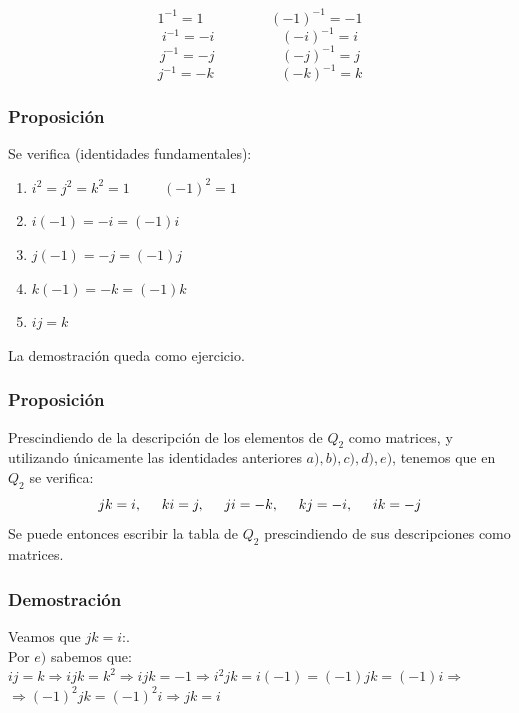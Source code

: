 \documentclass[11pt,a4paper]{article}
\begin{document}
$$1^{-1} = 1 \hspace{2cm} (-1)^{-1} = -1$$
$$i^{-1} = -i \hspace{2cm} (-i)^{-1} = i$$
$$j^{-1} = -j \hspace{2cm} (-j)^{-1} = j$$
$$j^{-1} = -k \hspace{2cm} (-k)^{-1} = k$$

\subsubsection*{Proposición}

Se verifica (identidades fundamentales):
\begin{enumerate}[label=\alph*)]
\item $i^{2} = j^{2} = k^{2} = 1 \hspace{1cm} (-1)^{2} = 1$
\item $i(-1) = -i = (-1)i$
\item $j(-1) = -j = (-1)j$
\item $k(-1) = -k = (-1)k$
\item $ij = k$
\end{enumerate}

La demostración queda como ejercicio.

\subsubsection*{Proposición}

Prescindiendo de la descripción de los elementos de $Q_{2}$ como matrices, y utilizando únicamente las identidades anteriores $a), b), c), d), e)$, tenemos que en $Q_{2}$ se verifica:
$$jk = i, \hspace{0.5cm} ki = j, \hspace{0.5cm} ji = -k, \hspace{0.5cm} kj = -i, \hspace{0.5cm} ik = -j$$
Se puede entonces escribir la tabla de $Q_{2}$ prescindiendo de sus descripciones como matrices.

\subsubsection*{Demostración}

Veamos que $jk = i$:.\\
Por $e)$ sabemos que: \\
$ij = k \Rightarrow ijk = k^{2} \Rightarrow ijk = -1 \Rightarrow i^{2}jk = i(-1) = (-1)jk = (-1)i \Rightarrow$ \\ $\Rightarrow (-1)^{2}jk = (-1)^{2}i \Rightarrow jk = i$
\end{document}
